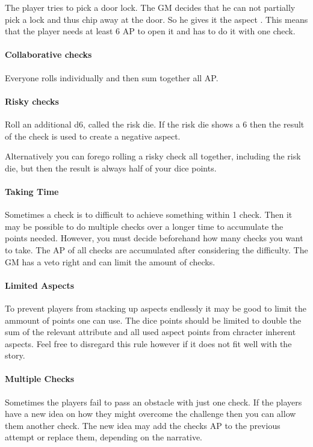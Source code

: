 \documentclass[11pt]{article}
\begin{document}
{\begin{pwexample}
The player tries to pick a door lock. The GM decides that he can not partially pick a lock and thus chip away at the door. So he gives it the aspect . This means that the player needs at least 6 AP to open it and has to do it with one check.
\end{pwexample}

\paragraph*{Collaborative checks}
\label{sec:orgcad2f1c}
Everyone rolls individually and then sum together all AP.

\paragraph*{Risky checks}
\label{sec:org94c7aba}
Roll an additional d6, called the risk die. If the risk die shows a 6 then the result of the check is used to create a negative aspect.

Alternatively you can forego rolling a risky check all together, including the risk die, but then the result is always half of your dice points.

\paragraph*{Taking Time}
\label{sec:orgb9fbb29}
Sometimes a check is to difficult to achieve something within 1 check. Then it may be possible to do multiple checks over a longer time to accumulate the points needed. However, you must decide beforehand how many checks you want to take. The AP of all checks are accumulated after considering the difficulty. The GM has a veto right and can limit the amount of checks.

\paragraph*{Limited Aspects}
\label{sec:org7e96010}
To prevent players from stacking up aspects endlessly it may be good to limit the ammount of points one can use. The dice points should be limited to double the sum of the relevant attribute and all used aspect points from chracter inherent aspects. Feel free to disregard this rule however if it does not fit well with the story.

\paragraph*{Multiple Checks}
\label{sec:org01c6215}
Sometimes the players fail to pass an obstacle with just one check. If the players have a new idea on how they might overcome the challenge then you can allow them another check. The new idea may add the checks AP to the previous attempt or replace them, depending on the narrative.

}
\end{document}
